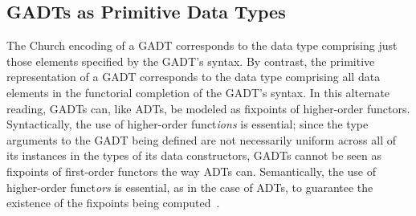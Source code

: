 \documentclass[acmsmall,screen,review,anonymous]{acmart}
\theoremstyle{definition}
\begin{document}
\subsection{GADTs as Primitive Data Types}\label{sec:prim-gadts}

The Church encoding of a GADT corresponds to the data type comprising
just those elements specified by the GADT's syntax. By contrast, the
primitive representation of a GADT corresponds to the data type
comprising all data elements in the functorial completion of the
GADT's syntax. In this alternate reading, GADTs can, like ADTs, be
modeled as fixpoints of higher-order functors. Syntactically, the use
of higher-order funct{\em ions} is essential; since the type arguments
to the GADT being defined are not necessarily uniform across all of
its instances in the types of its data constructors, GADTs cannot be
seen as fixpoints of first-order functors the way ADTs
can. Semantically, the use of higher-order funct{\em ors} is
essential, as in the case of ADTs, to guarantee the existence of the
fixpoints being computed~\cite{tfca}.
\end{document}
